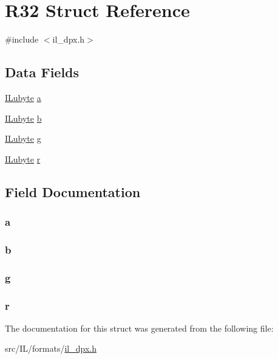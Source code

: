 \hypertarget{struct_r32}{\section{R32 Struct Reference}
\label{struct_r32}
}


{\ttfamily \#include $<$il\-\_\-dpx.\-h$>$}

\subsection*{Data Fields}
\begin{DoxyCompactItemize}
\item 
\hyperlink{il_8h_a8d2f04500100a86d1b00e98ab1b15a33}{I\-Lubyte} \hyperlink{struct_r32_a3110afaca40282cde44e6764cf21534b}{a}
\item 
\hyperlink{il_8h_a8d2f04500100a86d1b00e98ab1b15a33}{I\-Lubyte} \hyperlink{struct_r32_a767438b01504b1c7932519cfe8b34a1b}{b}
\item 
\hyperlink{il_8h_a8d2f04500100a86d1b00e98ab1b15a33}{I\-Lubyte} \hyperlink{struct_r32_a813a7b494594f710f6e04f086cb60fe7}{g}
\item 
\hyperlink{il_8h_a8d2f04500100a86d1b00e98ab1b15a33}{I\-Lubyte} \hyperlink{struct_r32_afedb8d54ff10b9cac4be2824f3928524}{r}
\end{DoxyCompactItemize}


\subsection{Field Documentation}
\hypertarget{struct_r32_a3110afaca40282cde44e6764cf21534b}{
\subsubsection[{a}]{ a}}\label{struct_r32_a3110afaca40282cde44e6764cf21534b}
\hypertarget{struct_r32_a767438b01504b1c7932519cfe8b34a1b}{
\subsubsection[{b}]{ b}}\label{struct_r32_a767438b01504b1c7932519cfe8b34a1b}
\hypertarget{struct_r32_a813a7b494594f710f6e04f086cb60fe7}{
\subsubsection[{g}]{ g}}\label{struct_r32_a813a7b494594f710f6e04f086cb60fe7}
\hypertarget{struct_r32_afedb8d54ff10b9cac4be2824f3928524}{
\subsubsection[{r}]{ r}}\label{struct_r32_afedb8d54ff10b9cac4be2824f3928524}


The documentation for this struct was generated from the following file\-:\begin{DoxyCompactItemize}
\item 
src/\-I\-L/formats/\hyperlink{il__dpx_8h}{il\-\_\-dpx.\-h}\end{DoxyCompactItemize}
